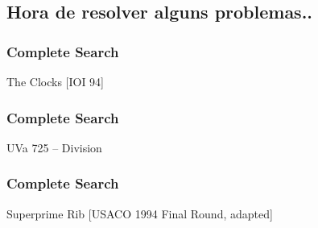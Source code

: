 \subsection{Hora de resolver alguns problemas..}

\begin{frame}
\frametitle{Complete Search}
\begin{block}{The Clocks [IOI 94]}
%
%
%
%
\end{block}
\end{frame}

\begin{frame}
\frametitle{Complete Search}
\begin{block}{UVa 725 -- Division}
\end{block}
\end{frame}

\begin{frame}
\frametitle{Complete Search}
\begin{block}{Superprime Rib [USACO 1994 Final Round, adapted]}
%
%
\end{block}
\end{frame}


